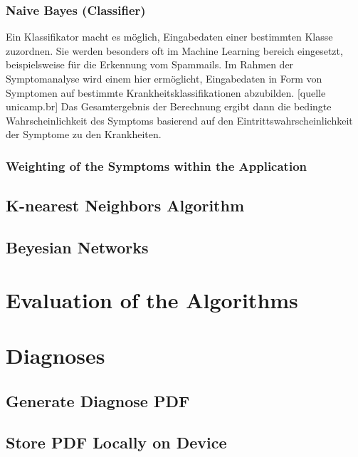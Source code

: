 \subsubsection{Naive Bayes (Classifier)}
Ein Klassifikator macht es möglich, Eingabedaten einer bestimmten Klasse zuzordnen. Sie werden besonders oft im Machine Learning bereich eingesetzt, beispielsweise für die Erkennung vom Spammails. Im Rahmen der Symptomanalyse wird einem hier ermöglicht, Eingabedaten in Form von Symptomen auf bestimmte Krankheitsklassifikationen abzubilden. [quelle unicamp.br] Das Gesamtergebnis der Berechnung ergibt dann die bedingte Wahrscheinlichkeit des Symptoms basierend auf den Eintrittswahrscheinlichkeit der Symptome zu den Krankheiten. 
\subsubsection{Weighting of the Symptoms within the Application}
\subsection{K-nearest Neighbors Algorithm}
\subsection{Beyesian Networks}
\section{Evaluation of the Algorithms}
\section{Diagnoses}
\subsection{Generate Diagnose PDF}
\subsection{Store PDF Locally on Device}
